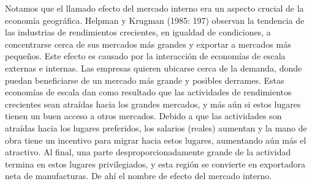 Notamos que el llamado efecto del mercado interno era un aspecto crucial de la economía geográfica. Helpman y Krugman (1985: 197) observan la tendencia de las industrias de rendimientos crecientes, en igualdad de condiciones, a concentrarse cerca de sus mercados más grandes y exportar a mercados más pequeños. Este efecto es causado por la interacción de economías de escala externas e internas. Las empresas quieren ubicarse cerca de la demanda, donde puedan beneficiarse de un mercado más grande y posibles derrames. Estas economías de escala dan como resultado que las actividades de rendimientos crecientes sean atraídas hacia los grandes mercados, y más aún si estos lugares tienen un buen acceso a otros mercados. Debido a que las actividades son atraídas hacia los lugares preferidos, los salarios (reales) aumentan y la mano de obra tiene un incentivo para migrar hacia estos lugares, aumentando aún más el atractivo. Al final, una parte desproporcionadamente grande de la actividad termina en estos lugares privilegiados, y esta región se convierte en exportadora neta de manufacturas. De ahí el nombre de efecto del mercado interno.\\

